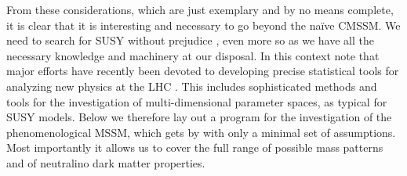From these considerations, which are just exemplary and by no means complete, 
it is clear that it is interesting and necessary to go beyond the na\"ive 
CMSSM. We need to search for SUSY without prejudice \cite{Berger:2008cq,Conley:2010du},  
even more so as we have all the necessary knowledge and machinery at 
our disposal. In this context note that major efforts have recently been 
devoted to developing precise statistical tools for analyzing new physics 
at the LHC \cite{Lyons:2003bw}. 
This includes sophisticated methods and tools for the investigation of 
multi-dimensional parameter spaces, as typical for SUSY models. 
Below we therefore lay out a program for the investigation of the 
phenomenological MSSM, which gets by with only a minimal set of assumptions. 
Most importantly it allows us to cover the full range of possible mass patterns 
and of neutralino dark matter properties.



